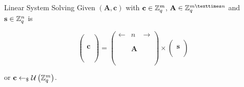 \documentclass[presentation,smaller]{beamer}
\newcommand{\ZZq}[1][blank]{\ensuremath{\ifthenelse{\equal{#1}{blank}}{\mathbb{Z}_q}{\mathbb{Z}_q\left[#1\right]}\xspace}}
\renewcommand{\U}[1]{\ensuremath{\mathcal{U}\left( {#1} \right)}\xspace}
\renewcommand{\vec}[1]{\ensuremath{\mathbf{#1}}\xspace}
\newcommand{\sample}{\ensuremath{\leftarrow_{\$}}}
\begin{document}
\begin{frame}[label={sec:orgheadline6}]{Linear System Solving}
Given \((\vec{A},\vec{c})\) with \(\vec{c} \in \ZZq^{m}\), \(\vec{A} \in \ZZq^{m × n}\) and \(\vec{s} \in \ZZq^{n}\) is

\[
\left(\begin{array}{c}
\\
\\
\\ 
\vec{c} \\
\\
\\
\\
\end{array} \right) = \left(
\begin{array}{ccc}
\leftarrow & n & \rightarrow \\
\\
\\ 
& \vec{A} & \\
\\
\\
\\
\end{array} \right) \times \left( \begin{array}{c}
\\
\vec{s} \\
\\
\end{array} \right)
\]

or \(\vec{c} \sample \U{\ZZq^{m}}\).
\end{frame}
\end{document}
